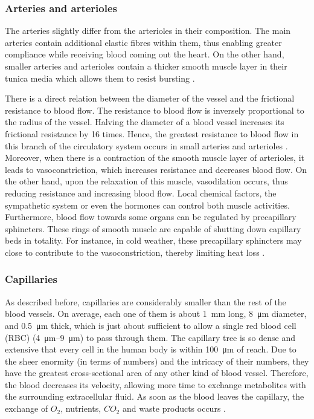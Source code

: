 \subsubsection{Arteries and arterioles}
The arteries slightly differ from the arterioles in their composition. The main arteries contain additional elastic fibres within them, thus enabling greater compliance while receiving blood coming out the heart. On the other hand, smaller arteries and arterioles contain a thicker smooth muscle layer in their tunica media which allows them to resist bursting \cite{Hall:2015aa, scanlon2014essentials}.  

There is a direct relation between the diameter of the vessel and the frictional resistance to blood flow. The resistance to blood flow is inversely proportional to the radius of the vessel. Halving the diameter of a blood vessel increases its frictional resistance by 16 times. Hence, the greatest resistance to blood flow in this branch of the circulatory system occurs in small arteries and arterioles \cite{Hall:2015aa}. Moreover, when there is a contraction of the smooth muscle layer of arterioles, it leads to vasoconstriction, which increases resistance and decreases blood flow. On the other hand, upon the relaxation of this muscle, vasodilation occurs, thus reducing resistance and increasing blood flow. Local chemical factors, the sympathetic system or even the hormones can control both muscle activities. Furthermore, blood flow towards some organs can be regulated by precapillary sphincters. These rings of smooth muscle are capable of shutting down capillary beds in totality. For instance, in cold weather, these precapillary sphincters may close to contribute to the vasoconstriction, thereby limiting heat loss \cite{Hall:2015aa, scanlon2014essentials}.  

\subsubsection{Capillaries}
As described before, capillaries are considerably smaller than the rest of the blood vessels. On average, each one of them is about \SI{1}{\milli\meter} long, \SI{8}{\um} diameter, and \SI{0.5}{\um} thick, which is just about sufficient to allow a single red blood cell (RBC) (\SIrange{4}{9}{\um}) to pass through them. The capillary tree is so dense and extensive that every cell in the human body is within \SI{100}{\um} of reach.  Due to the sheer enormity (in terms of numbers) and the intricacy of their numbers, they have the greatest cross-sectional area of any other kind of blood vessel. Therefore, the blood decreases its velocity, allowing more time to exchange metabolites with the surrounding extracellular fluid. As soon as the blood leaves the capillary, the exchange of $O_2$, nutrients, $CO_2$ and waste products occurs \cite{Hall:2015aa, scanlon2014essentials}. 

